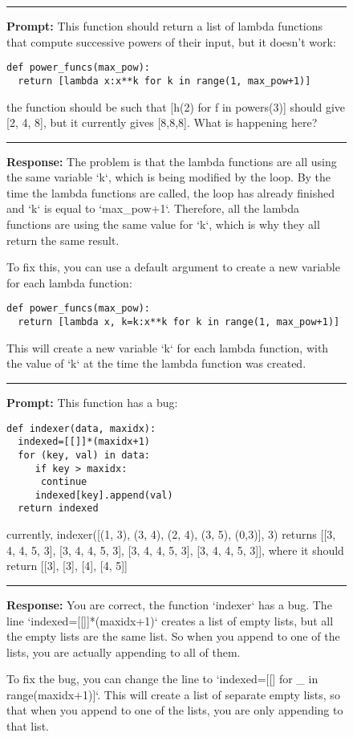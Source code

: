 \documentclass[10pt]{article}
\begin{document}
\begin{figure}[h!]
\small
\noindent\rule{\textwidth}{1pt}
   \textbf{Prompt:} This function should return a list of lambda functions  that compute successive powers of their input, but it doesn't work:

\begin{verbatim}
def power_funcs(max_pow):
  return [lambda x:x**k for k in range(1, max_pow+1)]
\end{verbatim}
the function should be such that [h(2) for f in powers(3)] should give [2, 4, 8], but it currently gives [8,8,8]. What is happening here? 

\noindent\rule{\textwidth}{1pt}
\textbf{Response: } 
The problem is that the lambda functions are all using the same variable `k`, which is being modified by the loop. By the time the lambda functions are called, the loop has already finished and `k` is equal to `max\_pow+1`. Therefore, all the lambda functions are using the same value for `k`, which is why they all return the same result.

To fix this, you can use a default argument to create a new variable for each lambda function:
\begin{verbatim}
def power_funcs(max_pow):
  return [lambda x, k=k:x**k for k in range(1, max_pow+1)]
\end{verbatim}
This will create a new variable `k` for each lambda function, with the value of `k` at the time the lambda function was created.\\
\noindent\rule{\textwidth}{1pt}
   \textbf{Prompt:} This function has a bug:

\begin{verbatim}
def indexer(data, maxidx):
  indexed=[[]]*(maxidx+1)
  for (key, val) in data:
     if key > maxidx:
      continue
     indexed[key].append(val)
  return indexed
\end{verbatim}
currently, indexer([(1, 3), (3, 4), (2, 4), (3, 5), (0,3)], 3) returns [[3, 4, 4, 5, 3], [3, 4, 4, 5, 3], [3, 4, 4, 5, 3], [3, 4, 4, 5, 3]], where it should return [[3], [3], [4], [4, 5]]

\noindent\rule{\textwidth}{1pt}
\textbf{Response: } 
You are correct, the function `indexer` has a bug. The line `indexed=[[]]*(maxidx+1)` creates a list of empty lists, but all the empty lists are the same list. So when you append to one of the lists, you are actually appending to all of them.

To fix the bug, you can change the line to `indexed=[[] for \_ in range(maxidx+1)]`. This will create a list of separate empty lists, so that when you append to one of the lists, you are only appending to that list.


\end{figure}
\end{document}
